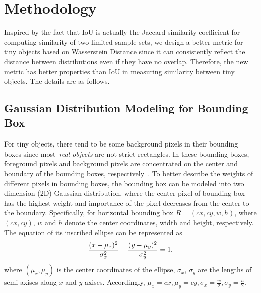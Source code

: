 \documentclass{article}
\newcommand{\equspace}{3.0pt}
\begin{document}
\section{Methodology}

Inspired by the fact that IoU is actually the Jaccard similarity coefficient for computing similarity of two limited sample sets, we design a better metric for tiny objects based on Wasserstein Distance since it can consistently reflect the distance between distributions even if they have no overlap. Therefore, the new metric has better properties than IoU in measuring similarity between tiny objects. The details are as follows.

\subsection{Gaussian Distribution Modeling for Bounding Box}
\label{sec::gaussianmodeling}
For tiny objects, there tend to be some background pixels in their bounding boxes since most~\textit{real objects} are not strict rectangles. In these bounding boxes, foreground pixels and background pixels are concentrated on the center and boundary of the bounding boxes, respectively~\cite{CenterMap-Net_2020_TGRS}. To better describe the weights of different pixels in bounding boxes, the bounding box can be modeled into two dimension (2D) Gaussian distribution, where the center pixel of bounding box has the highest weight and importance of the pixel decreases from the center to the boundary. Specifically, for horizontal bounding box $R=(cx,cy,w,h)$, where $(cx, cy)$, $w$ and $h$ denote the center coordinates, width and height, respectively. The equation of its inscribed ellipse can be represented as 
\begin{equation}
    \setlength{\abovedisplayskip}{\equspace}
	\setlength{\belowdisplayskip}{\equspace}
    \frac{(x-\mu _{x})^2}{\sigma _{x}^{2}}+ \frac{(y-\mu _{y})^2}{\sigma _{y}^{2}}=1,
    \label{eq3.1}
\end{equation}
where $(\mu _{x}, \mu _{y})$ is the center coordinates of the ellipse, $\sigma _{x}$, $\sigma _{y}$ are the lengths of semi-axises along $x$ and $y$ axises. Accordingly, $\mu _{x}=cx, \mu _{y}=cy, \sigma _{x}=\frac{w}{2}, \sigma _{y}=\frac{h}{2}$.
\end{document}
